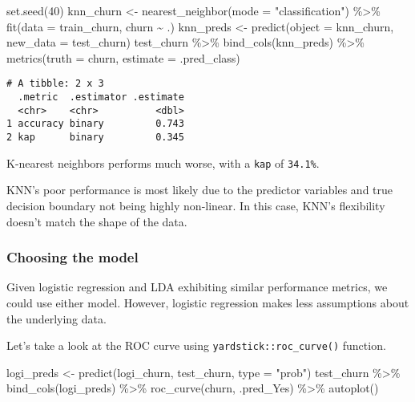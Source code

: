 \documentclass[
]{article}
\newenvironment{Shaded}{\begin{snugshade}}{\end{snugshade}}
\newcommand{\AttributeTok}[1]{\textcolor[rgb]{0.77,0.63,0.00}{#1}}
\newcommand{\DecValTok}[1]{\textcolor[rgb]{0.00,0.00,0.81}{#1}}
\newcommand{\FunctionTok}[1]{\textcolor[rgb]{0.00,0.00,0.00}{#1}}
\newcommand{\NormalTok}[1]{#1}
\newcommand{\OtherTok}[1]{\textcolor[rgb]{0.56,0.35,0.01}{#1}}
\newcommand{\SpecialCharTok}[1]{\textcolor[rgb]{0.00,0.00,0.00}{#1}}
\newcommand{\StringTok}[1]{\textcolor[rgb]{0.31,0.60,0.02}{#1}}
\begin{document}
\begin{Shaded}
\begin{Highlighting}[]
\FunctionTok{set.seed}\NormalTok{(}\DecValTok{40}\NormalTok{)}
\NormalTok{knn\_churn }\OtherTok{\textless{}{-}} \FunctionTok{nearest\_neighbor}\NormalTok{(}\AttributeTok{mode =} \StringTok{"classification"}\NormalTok{) }\SpecialCharTok{\%\textgreater{}\%}
  \FunctionTok{fit}\NormalTok{(}\AttributeTok{data =}\NormalTok{ train\_churn, churn }\SpecialCharTok{\textasciitilde{}}\NormalTok{ .)}
\NormalTok{knn\_preds }\OtherTok{\textless{}{-}} \FunctionTok{predict}\NormalTok{(}\AttributeTok{object =}\NormalTok{ knn\_churn, }\AttributeTok{new\_data =}\NormalTok{ test\_churn)}
\NormalTok{test\_churn }\SpecialCharTok{\%\textgreater{}\%}
  \FunctionTok{bind\_cols}\NormalTok{(knn\_preds) }\SpecialCharTok{\%\textgreater{}\%}
  \FunctionTok{metrics}\NormalTok{(}\AttributeTok{truth =}\NormalTok{ churn, }\AttributeTok{estimate =}\NormalTok{ .pred\_class)}
\end{Highlighting}
\end{Shaded}

\begin{verbatim}
# A tibble: 2 x 3
  .metric  .estimator .estimate
  <chr>    <chr>          <dbl>
1 accuracy binary         0.743
2 kap      binary         0.345
\end{verbatim}

K-nearest neighbors performs much worse, with a \texttt{kap} of
\texttt{34.1\%}.

KNN's poor performance is most likely due to the predictor variables and
true decision boundary not being highly non-linear. In this case, KNN's
flexibility doesn't match the shape of the data.

\hypertarget{choosing-the-model}{%
\subsubsection{Choosing the model}\label{choosing-the-model}}

Given logistic regression and LDA exhibiting similar performance
metrics, we could use either model. However, logistic regression makes
less assumptions about the underlying data.

Let's take a look at the ROC curve using
\texttt{yardstick::roc\_curve()} function.

\begin{Shaded}
\begin{Highlighting}[]
\NormalTok{logi\_preds }\OtherTok{\textless{}{-}} \FunctionTok{predict}\NormalTok{(logi\_churn, test\_churn, }\AttributeTok{type =} \StringTok{"prob"}\NormalTok{)}
\NormalTok{test\_churn }\SpecialCharTok{\%\textgreater{}\%}
  \FunctionTok{bind\_cols}\NormalTok{(logi\_preds) }\SpecialCharTok{\%\textgreater{}\%}
  \FunctionTok{roc\_curve}\NormalTok{(churn, .pred\_Yes) }\SpecialCharTok{\%\textgreater{}\%}
  \FunctionTok{autoplot}\NormalTok{()}
\end{Highlighting}
\end{Shaded}
\end{document}
